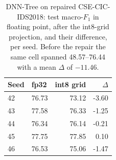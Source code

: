 \begin{table}[t]\centering\small
\caption{DNN-Tree on repaired CSE-CIC-IDS2018: test macro-$F_1$ in floating point, after the int8-grid projection, and their difference, per seed. Before the repair the same cell spanned 48.57--76.44 with a mean $\Delta$ of $-11.46$.}
\label{tab:m6:perseed}
\begin{tabular}{llrr}
\toprule
Seed & fp32 & int8 grid & $\Delta$ \\
\midrule
42 & 76.73 & 73.12 & -3.60 \\
43 & 77.58 & 76.33 & -1.25 \\
44 & 76.34 & 76.14 & -0.21 \\
45 & 77.75 & 77.85 & 0.10 \\
46 & 76.53 & 75.06 & -1.47 \\
\bottomrule
\end{tabular}
\end{table}
